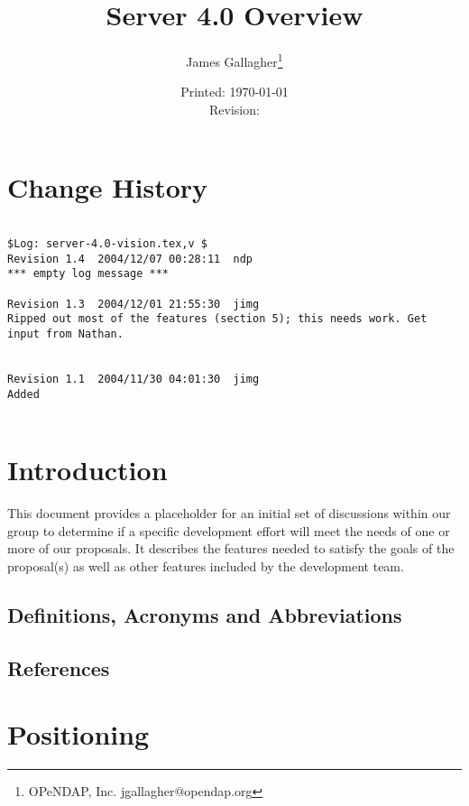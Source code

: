 \documentclass[justify]{dods-paper}
\title{Server 4.0 Overview}
\author{James Gallagher\thanks{OPeNDAP, Inc.
    jgallagher@opendap.org}}
\date{Printed: \today \\ Revision: \rcsInfoRevision}
\begin{document}
\maketitle

\section* {Change History}

\begin{verbatim}

$Log: server-4.0-vision.tex,v $
Revision 1.4  2004/12/07 00:28:11  ndp
*** empty log message ***

Revision 1.3  2004/12/01 21:55:30  jimg
Ripped out most of the features (section 5); this needs work. Get
input from Nathan.


Revision 1.1  2004/11/30 04:01:30  jimg
Added


\end{verbatim}

\tableofcontents


\section{Introduction}

This document provides a placeholder for an initial set of discussions within our group to determine if a specific development effort will meet the needs of one or more of our proposals. It describes the features needed to satisfy the goals of the proposal(s) as well as other features included by the development team.

\subsection{Definitions, Acronyms and Abbreviations}

\subsection{References}


\raggedright


\section{Positioning} %
\end{document}
